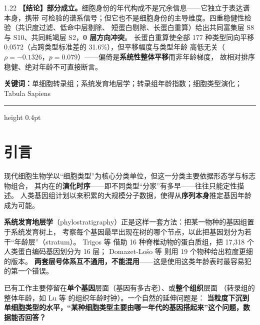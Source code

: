 \documentclass[UTF8, a4paper, 11pt]{ctexart}
\begin{document}
\begin{spacing}{1.22}
\vspace{0.2em}\noindent
\textbf{【结论】}\textbf{部分成立。}细胞身份的年代构成不是冗余信息——它独立于表达谱本身，携带
可检验的谱系信号；但它也不是细胞身份的主导维度。四重稳健性检验（共识度过滤、低命中层剔除、
短蛋白剔除、长蛋白重算）给出共同富集层 S8 与 S10、共同耗竭层 S2，\textbf{0 层方向冲突}。
长蛋白重算使全部 177 种类型同向平移 0.0572（占跨类型标准差的 31.6\%），但平移幅度与类型年龄
高低无关（$\rho = -0.1326$，$p = 0.079$）——偏倚是\textbf{系统性整体平移}而非年龄梯度，
故相对排序稳健、绝对年龄不可直接断言。

\vspace{0.45em}
\noindent\textbf{关键词：}单细胞转录组；系统发育地层学；转录组年龄指数；细胞类型演化；Tabula Sapiens

\vspace{0.2em}

\vspace{0.3em}
\hrule height 0.4pt

\vspace{0.35em}
\end{spacing}

\section{引言}

现代细胞生物学以“细胞类型”为核心分类单位，但这一分类主要依据形态学与标志物组合，
其内在的\textbf{演化时序}——即不同类型“分家”有多早——往往只能定性描述。
人类基因组计划以来积累的大规模分子数据，使得从\textbf{序列本身}推定基因年龄成为可能。

\textbf{系统发育地层学}（phylostratigraphy）正是这样一套方法：把某一物种的基因组置于系统发育树上，
考察每个基因最早出现在树的哪个节点，以此把基因划分为若干“年龄层”（stratum）。
Trigos 等\citep{trigos2017} 借助 16 种脊椎动物的蛋白质组，把 17,318 个人类蛋白编码基因划分为 16 层；
Domazet-Lo\v{s}o 等\citep{domazetloso2017} 则用 19 个物种给出粒度更细的版本。
\textbf{两套层号体系互不通用，不能混用}——这是使用这类年龄表时最容易犯的第一个错误。

已有工作主要停留在\textbf{单个基因}层面（基因有多古老）、或\textbf{整个组织}层面
（转录组的整体年龄，如 Lu 等\citep{lu2017} 的组织年龄时钟）。一个自然的延伸问题是：
\textbf{当粒度下沉到单细胞类型的水平，“某种细胞类型主要由哪一年代的基因搭起来”这个问题，数据能否回答？}
\end{document}
